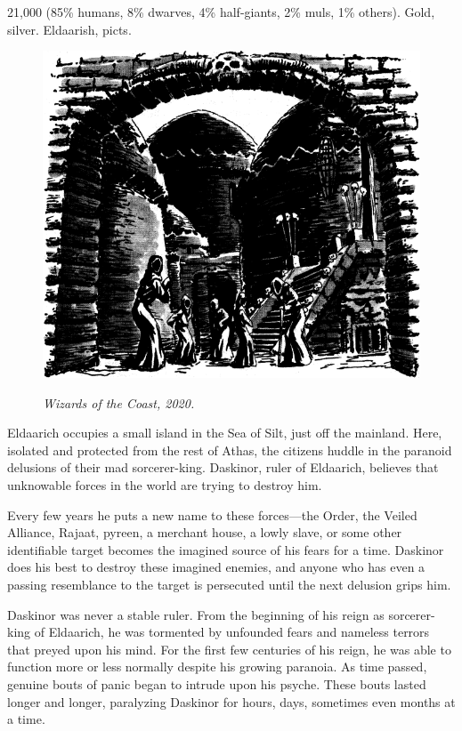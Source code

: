 {21,000 (85\% humans, 8\% dwarves, 4\% half-giants, 2\% muls, 1\% others).}
{Gold, silver.}
{Eldaarish, picts.}
{
\begin{figure}[b!]
\centering
\includegraphics[height=0.4\paperheight]{images/eldaarich-1.png}
\par\textit{\small\textcopyright Wizards of the Coast, 2020.}
\end{figure}

	Eldaarich occupies a small island in the Sea of Silt, just off the mainland. Here, isolated and protected from the rest of Athas, the citizens huddle in the paranoid delusions of their mad sorcerer-king. Daskinor, ruler of Eldaarich, believes that unknowable forces in the world are trying to destroy him.

	Every few years he puts a new name to these forces---the Order, the Veiled Alliance, Rajaat, pyreen, a merchant house, a lowly slave, or some other identifiable target becomes the imagined source of his fears for a time. Daskinor does his best to destroy these imagined enemies, and anyone who has even a passing resemblance to the target is persecuted until the next delusion grips him.

	Daskinor was never a stable ruler. From the beginning of his reign as sorcerer-king of Eldaarich, he was tormented by unfounded fears and nameless terrors that preyed upon his mind. For the first few centuries of his reign, he was able to function more or less normally despite his growing paranoia. As time passed, genuine bouts of panic began to intrude upon his psyche. These bouts lasted longer and longer, paralyzing Daskinor for hours, days, sometimes even months at a time.

}
